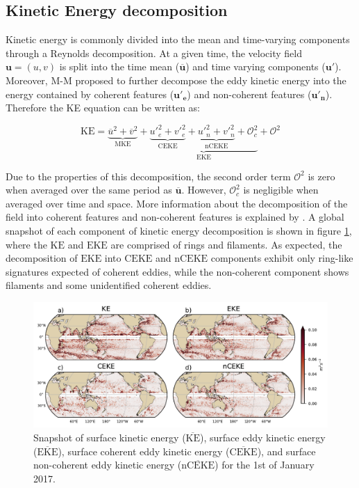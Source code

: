 \documentclass[draft,linenumbers]{agujournal2019}
\newcommand{\MKE}{\overline{\textrm{KE}}}
\newcommand{\mKE}{\textrm{MKE}}
\newcommand{\KE}{\textrm{KE}}
\newcommand{\MEKE}{\overline{\textrm{EKE}}}
\newcommand{\EKE}{\textrm{EKE}}
\newcommand{\MCEKE}{\overline{\textrm{CEKE}}}
\newcommand{\CEKE}{\textrm{CEKE}}
\newcommand{\MnCEKE}{\overline{\textrm{nCEKE}}}
\newcommand{\nCEKE}{\textrm{nCEKE}}
\begin{document}
	\subsection{Kinetic Energy decomposition}

	Kinetic energy is commonly divided into the mean and time-varying components through a Reynolds decomposition. At a given time, the velocity field $\mathbf{u} = (u,v)$ is split into the time mean ($\mathbf{\overline{u}}$) and time varying components ($\mathbf{u'}$). Moreover, M-M proposed to further decompose the eddy kinetic energy into the energy contained by coherent features ($\mathbf{u'_e}$) and non-coherent features ($\mathbf{u'_n}$). Therefore the KE equation can be written as:
	
	\begin{equation}
		\mathrm{KE} = \underbrace{\overline{u}^2 + \overline{v}^2}_{\mKE} + 
		\underbrace{\underbrace{{u'}_e^2+{v'}_e^2}_{\CEKE}  + \underbrace{{u'}_n^2+{v'}_n^2}_{\nCEKE} + \mathcal{O}_c^2 }_{\EKE} + \mathcal{O}^2
	\end{equation}

	Due to the properties of this decomposition, the second order term $\mathcal{O}^2$ is zero when averaged over the same period as $\mathbf{\overline{u}}$. However, $\mathcal{O}_c^2$ is negligible when averaged over time and space. More information about the decomposition of the field into coherent features and non-coherent features is explained by \citet{Martinez_TKE_2019}. A global snapshot of each component of kinetic energy decomposition is shown in figure \ref{fig:eddy_snapshot}, where the $\KE$ and $\EKE$ are comprised of rings and filaments. As expected, the decomposition of $\EKE$ into $\CEKE$ and $\nCEKE$ components exhibit only ring-like signatures expected of coherent eddies, while the non-coherent component shows filaments and some unidentified coherent eddies.

	\begin{figure}
	    \centering
	    \includegraphics[width=1\textwidth]{figures/snapshot_ke_maps_satellite.pdf}
	    \caption{Snapshot of surface kinetic energy ($\MKE$), surface eddy kinetic energy ($\MEKE$), surface coherent eddy kinetic energy ($\MCEKE$), and surface non-coherent eddy kinetic energy ($\MnCEKE$) for the 1st of January 2017.}
	    \label{fig:eddy_snapshot}
	\end{figure}
\end{document}
